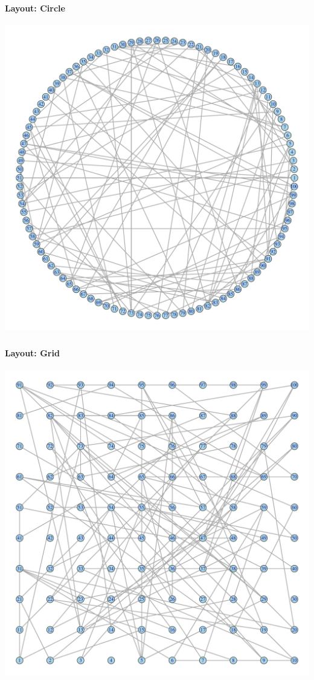 \documentclass[8pt]{beamer}
\begin{document}

\begin{frame}
\frametitle{\insertsection}
\framesubtitle{Layout: Circle}

\centering
\includegraphics[height=0.85\textheight]{circle}

\end{frame}


\begin{frame}
\frametitle{\insertsection}
\framesubtitle{Layout: Grid}

\centering
\includegraphics[height=0.85\textheight]{grid}
 
\end{frame}
\end{document}
